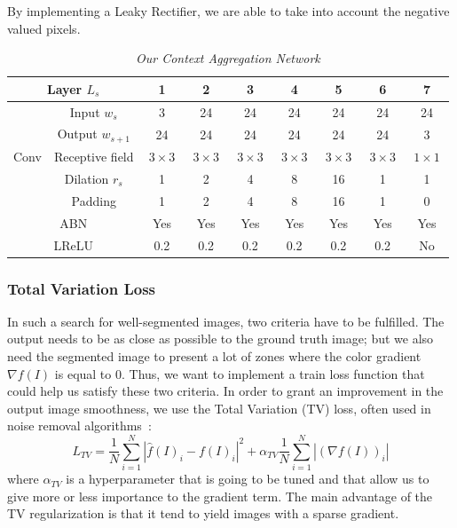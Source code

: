 \documentclass{article}
\begin{document}
            \noindent By implementing a Leaky Rectifier, we are able to take into account the negative valued pixels.

            \begin{table}[!ht]
                \centering
                \begin{tabular}{|c|c||c|cccc|cc|}
                    \hline
                    \multicolumn{2}{|c||}{Layer $L_s$} & 1 & 2 & 3 & 4 & 5 & 6 & 7 \\
                    \hline
                    \hline
                     & Input $w_s$ & 3 & 24 & 24 & 24 & 24 & 24 & 24 \\
                     & Output $w_{s+1}$ & 24 & 24 & 24 & 24 & 24 & 24 & 3 \\
                    \cline{2-9}
                    Conv & Receptive field & $\ 3\times 3\ $ & $\ 3\times 3\ $ & $\ 3\times 3\ $ & $\ 3\times 3\ $ & $\ 3\times 3\ $ & $\ 3\times 3\ $ & $\ 1\times 1\ $ \\
                     & Dilation $r_s$ & 1 & 2 & 4 & 8 & 16 & 1 & 1 \\
                     & Padding & 1 & 2 & 4 & 8 & 16 & 1 & 0 \\
                    \hline
                    \multicolumn{2}{|c||}{ABN} & Yes & Yes & Yes & Yes & Yes & Yes & Yes \\
                    \hline
                    \multicolumn{2}{|c||}{LReLU} & 0.2 & 0.2 & 0.2 & 0.2 & 0.2 & 0.2 & No \\
                    \hline
                \end{tabular}
                \caption{\textit{Our Context Aggregation Network}}
            \end{table}

\newpage
        \subsubsection{Total Variation Loss}
            In such a search for well-segmented images, two criteria have to be fulfilled. The output needs to be as close as possible to the ground truth image; but we also need the segmented image to present a lot of zones where the color gradient $\nabla f(I)$ is equal to $0$. Thus, we want to implement a train loss function that could help us satisfy these two criteria.
            In order to grant an improvement in the output image smoothness, we use the Total Variation (TV) loss, often used in noise removal algorithms~\cite{rudin1992,chambolle2004}:
            $$
            L_{TV}=\frac{1}{N}\sum_{i=1}^N |\hat{f}(I)_i-f(I)_i|^2+\alpha_{TV}\frac{1}{N}\sum_{i=1}^N|(\nabla f(I))_i|
            $$
            where $\alpha_{TV}$ is a hyperparameter that is going to be tuned and that allow us to give more or less importance to the gradient term. The main advantage of the TV regularization is that it tend to yield images with a sparse gradient.
\end{document}
